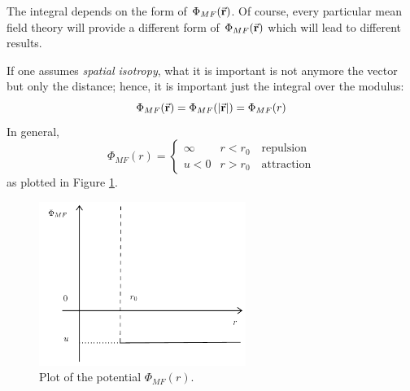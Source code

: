 \documentclass[../main/main.tex]{subfiles}
\begin{document}
\begin{remark}
The integral depends on the form of \( \Phi _{MF} (\va{r})  \). Of course, every particular mean field theory will provide a different form of \( \Phi _{MF} (\va{r})  \) which will lead to different results.
\end{remark}

If one assumes \emph{spatial isotropy},
what it is important is not anymore the vector but only the distance; hence, it is important just the integral over the modulus:
\begin{equation*}
    \Phi _{MF} (\va{r}) = \Phi _{MF} (\abs{\va{r}} ) = \Phi _{MF} (r)
\end{equation*}
In general,
\begin{equation}
\Phi _{MF} (r) =
  \begin{cases}
   \infty & r < r_0 \quad  \text{repulsion}\\
   u < 0 & r> r_0  \quad \text{attraction}
  \end{cases}
\end{equation}
as plotted in Figure \ref{fig:14_1}.
\begin{figure}[h!]
\centering
\includegraphics[width=0.6\textwidth]{../lessons/14_image/1.pdf}
\caption{\label{fig:14_1} Plot of the potential \( \Phi _{MF} (r) \).}
\end{figure}
\end{document}
